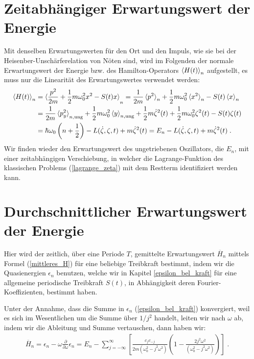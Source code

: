   \section{Zeitabhängiger Erwartungswert der Energie}
    Mit denselben Erwartungswerten für den Ort und den Impuls, wie sie bei der Heisenber-Unschärferelation von Nöten sind, wird im Folgenden der normale Erwartungswert der Energie bzw. des Hamilton-Operators $\braket{H(t)}_n$ aufgestellt, es muss nur die Linearität des Erwartungswertes verwendet werden:
    \begin{align}
      \braket{H(t)}_n &= \braket{\frac{p^2}{2m} + \frac{1}{2}m\omega_0^2x^2 - S(t)x}_n
      =\frac{1}{2m}\braket{p^2}_n + \frac{1}{2}m\omega_0^2\braket{x^2}_n - S(t)\braket{x}_n \notag\\
      &= \frac{1}{2m}\braket{p^2_y}_{n,\text{ung}} + \frac{1}{2}m\omega_0^2\braket{y}_{n,\text{ung}} + \frac{1}{2}m\dot{\zeta}^2(t) + \frac{1}{2}m\omega_0^2\zeta^2(t) - S(t)\zeta(t) \notag\\
      &= \hbar\omega_0\left(n+\frac{1}{2}\right) - L(\dot{\zeta},\zeta,t) + m\dot{\zeta}^2(t) = E_n - L(\dot{\zeta},\zeta,t) + m\dot{\zeta}^2(t) \; .
    \end{align}
    Wir finden wieder den Erwartungswert des ungetriebenen Oszillators, die $E_n$, mit einer zeitabhängigen Verschiebung, in welcher die Lagrange-Funktion des klassischen Problems (\ref{lagrange_zeta}) mit dem Restterm identifiziert werden kann.

  \section{Durchschnittlicher Erwartungswert der Energie}
    Hier wird der zeitlich, über eine Periode $T$, gemittelte Erwartungswert $\overline{H}_n$ mittels Formel (\ref{mittleres_H}) für eine beliebige Treibkraft bestimmt, indem wir die Quasienergien $\epsilon_n$ benutzen, welche wir in Kapitel \ref{epsilon_bel_kraft} für eine allgemeine periodische Treibkraft $S(t)$, in Abhängigkeit deren Fourier-Koeffizienten, bestimmt haben.

    Unter der Annahme, dass die Summe in $\epsilon_n$ (\ref{epsilon_bel_kraft}) konvergiert, weil es sich im Wesentlichen um die Summe über $1/j^2$ handelt, leiten wir nach $\omega$ ab, indem wir die Ableitung und Summe vertauschen, dann haben wir:
    \begin{align}
      \overline{H}_n = \epsilon_n - \omega\frac{\partial}{\partial \omega}\epsilon_n
      = E_n - \sum_{j=-\infty}^{\infty} \left[ \frac{c_jc_{-j}}{2m(\omega_0^2-j^2\omega^2)}\left( 1-\frac{2j^2\omega^2}{(\omega_0^2-j^2\omega^2)}\right) \right] \; .
    \end{align}

